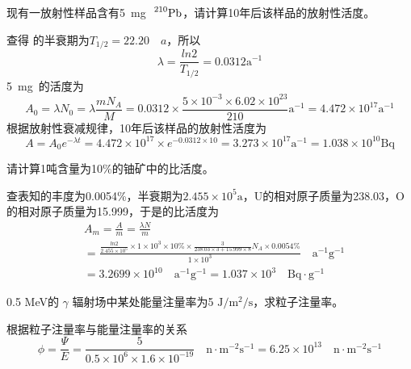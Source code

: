 \begin{problem}[2]
  现有一放射性样品含有5~mg~$\sideset{^{210}}{}{\mathop{\mathrm{Pb}}}$，请计算10年后该样品的放射性活度。 
\end{problem}

\begin{solution}
  查得 的半衰期为$T_{1/2}=22.20 \quad a$，所以
  \[\lambda = \frac{ln2}{T_{1/2}}=0.0312 \text{a}^{-1}\]
  5~mg~的活度为
  \[A_0=\lambda N_0=\lambda \frac{m N_A}{M}=0.0312 \times \frac{5 \times 10^{-3} \times 6.02 \times 10^{23}}{210} \text{a}^{-1}=4.472 \times 10^{17} \text{a}^{-1}\]
  根据放射性衰减规律，10年后该样品的放射性活度为
	\[A=A_0 e^{- \lambda t}=4.472 \times 10^{17} \times e^{-0.0312 \times 10}=3.273 \times 10^{17} \text{a}^{-1}=1.038 \times 10^{10} \text{Bq}\]
\end{solution}

\begin{problem}[3]
  请计算1吨含量为10\%的铀矿中的比活度。
\end{problem}

\begin{solution}
	查表知的丰度为0.0054\%，半衰期为$2.455 \times 10^5 \text{a}$，U的相对原子质量为238.03，O的相对原子质量为15.999，于是的比活度为
	\[\begin{split}
		&	A_m=\frac{A}{m}=\frac{\lambda N}{m} \\
		& =\frac{\frac{ln2}{2.455 \times 10^5} \times 1 \times 10^3 \times 10\% \times \frac{3}{238.03 \times 3 + 15.999 \times 8}N_A \times 0.0054\%}{1 \times 10^3} \quad \text{a}^{-1} \text{g}^{-1} \\
		& = 3.2699 \times 10^{10} \quad \text{a}^{-1} \text{g}^{-1} =1.037 \times 10^3 \quad \text{Bq} \cdot \text{g}^{-1}
	\end{split}\]
\end{solution}

\begin{problem}[4]
  0.5 MeV的 $\gamma$ 辐射场中某处能量注量率为5 $\text{J}/\text{m}^2/\text{s} $，求粒子注量率。
\end{problem}

\begin{solution}
	根据粒子注量率与能量注量率的关系
	\[\phi=\frac{\Psi}{E}=\frac{5}{0.5 \times 10^6 \times 1.6 \times 10^{-19}} \quad \text{n}\cdot\text{m}^{-2}\text{s}^{-1}=6.25 \times 10^{13}\quad \text{n}\cdot\text{m}^{-2}\text{s}^{-1}\]
\end{solution}

